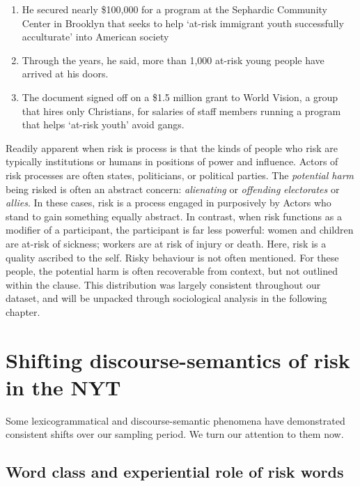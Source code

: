 \begin{enumerate}    [before=\color{black}\ttfamily] \setlength\itemsep{0em} \small

\item He secured nearly \$100,000 for a program at the Sephardic Community Center in Brooklyn that seeks to help `at-risk immigrant youth successfully acculturate' into American society
\item Through the years, he said, more than 1,000 at-risk young people have arrived at his doors.
\item The document signed off on a \$1.5 million grant to World Vision, a group that hires only Christians, for salaries of staff members running a program that helps `at-risk youth' avoid gangs.
\end{enumerate}
%
Readily apparent when risk is process is that the kinds of people who risk are typically institutions or humans in positions of power and influence. Actors of risk processes are often states, politicians, or political parties. The \emph{potential harm} being risked is often an abstract concern: \emph{alienating} or \emph{offending} \emph{electorates} or \emph{allies}. In these cases, risk is a process engaged in purposively by Actors who stand to gain something equally abstract. In contrast, when risk functions as a modifier of a participant, the participant is far less powerful: women and children are at-risk of sickness; workers are at risk of injury or death. Here, risk is a quality ascribed to the self. Risky behaviour is not often mentioned. For these people, the potential harm is often recoverable from context, but not outlined within the clause. This distribution was largely consistent throughout our dataset, and will be unpacked through sociological analysis in the following chapter. %

\section{Shifting discourse-semantics of risk in the NYT}

Some lexicogrammatical and discourse-semantic phenomena have demonstrated consistent shifts over our sampling period. We turn our attention to them now.

\subsection{Word class and experiential role of risk words} \label{sect:diff_between_nom_ver_risk}


